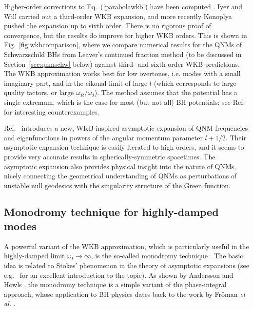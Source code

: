 \documentclass[]{iopart}
\begin{document}
Higher-order corrections to Eq.~(\ref{parabolawkb}) have been computed
\cite{pressringdown}. Iyer and Will \cite{Iyer:1986np,Iyer:1986nq} carried out
a third-order WKB expansion, and more recently Konoplya \cite{Konoplya:2003ii}
pushed the expansion up to sixth order. There is no rigorous proof of
convergence, but the results do improve for higher WKB orders. This is shown
in Fig.~\ref{fig:wkbcomparison}, where we compare numerical results for the
QNMs of Schwarzschild BHs from Leaver's continued fraction method (to be
discussed in Section~\ref{sec:qnmschw} below) against third- and sixth-order
WKB predictions.  The WKB approximation works best for low overtones,
i.e. modes with a small imaginary part, and in the eikonal limit of large $l$
(which corresponds to large quality factors, or large
$\omega_R/\omega_I$). The method assumes that the potential has a single
extremum, which is the case for most (but not all) BH potentials: see
Ref.~\cite{Ishibashi:2003ap} for interesting counterexamples.

Ref.~\cite{DolanPRL} introduces a new, WKB-inspired asymptotic expansion of
QNM frequencies and eigenfunctions in powers of the angular momentum parameter
$l+1/2$. Their asymptotic expansion technique is easily iterated to high
orders, and it seems to provide very accurate results in spherically-symmetric
spacetimes.  The asymptotic expansion also provides physical insight into the
nature of QNMs, nicely connecting the geometrical understanding of QNMs as
perturbations of unstable null geodesics with the singularity structure of the
Green function.

\subsection{\label{monodromy}Monodromy technique for highly-damped modes}

A powerful variant of the WKB approximation, which is particularly useful in
the highly-damped limit $\omega_I\to \infty$, is the so-called monodromy
technique \cite{Motl:2003cd}. The basic idea is related to Stokes' phenomenon
in the theory of asymptotic expansions (see e.g.~\cite{Froeman:1965} for an
excellent introduction to the topic). As shown by Andersson and Howls
\cite{Andersson:2003fh}, the monodromy technique is a simple variant of the
phase-integral approach, whose application to BH physics dates back to the
work by Fr\"oman {\it et al.}  \cite{Froeman:1992gp}.
%
\end{document}
